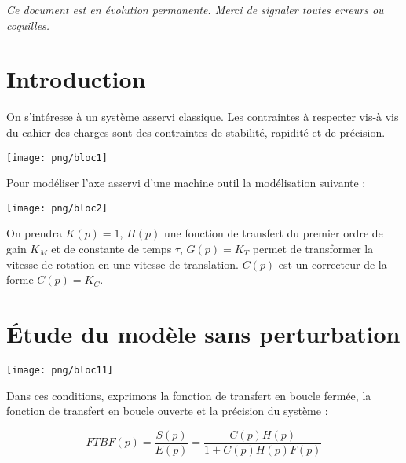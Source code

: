 \documentclass[10pt,oneside]{article}
\begin{document}
\setlength{\parskip}{0ex plus 0.2ex minus 0ex}
 \renewcommand{\contentsname}{}
 \renewcommand{\baselinestretch}{1}

\textit{Ce document est en évolution permanente. Merci de signaler toutes
erreurs ou coquilles.}

\tableofcontents

 \renewcommand{\baselinestretch}{1.2}
\setlength{\parskip}{2ex plus 0.5ex minus 0.2ex}

\section{Introduction}


On s'intéresse à un système asservi classique. Les contraintes à respecter vis-à vis du cahier des charges sont des contraintes de stabilité, rapidité et de précision.

\begin{center}
\texttt{[image: png/bloc1]}
\end{center}

\begin{exemple}
Pour modéliser l'axe asservi d'une machine outil la modélisation suivante :
\begin{center}
\texttt{[image: png/bloc2]}
\end{center}
On prendra $K(p)=1$, $H(p)$ une fonction de transfert du premier ordre de gain $K_M$ et de constante de temps $\tau$, $G(p)=K_T$ permet de transformer la vitesse de rotation en une vitesse de translation. $C(p)$ est un correcteur de la forme $C(p)=K_C$.
\end{exemple}


\section{Étude du modèle sans perturbation}


\begin{minipage}[c]{.48\linewidth}
\begin{center}
\texttt{[image: png/bloc11]}
\end{center}
\end{minipage}\hfill
\begin{minipage}[c]{.48\linewidth}
Dans ces conditions, exprimons la fonction de transfert en boucle fermée, la fonction de transfert en boucle ouverte et la précision du système :

$$
FTBF(p)
=\dfrac{S(p)}{E(p)}
=\dfrac{C(p)H(p)}{1+C(p)H(p)F(p)}
$$

\end{minipage}
\end{document}
